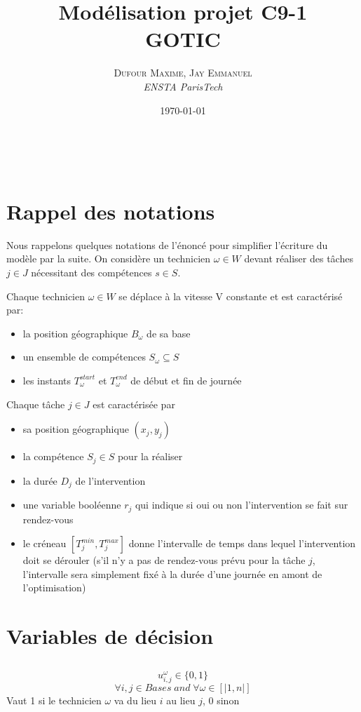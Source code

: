 \documentclass[a4paper, 11pt]{article} %
\title{\textbf{Modélisation projet C9-1}\\ %
GOTIC} %
\author{\textsc{Dufour Maxime, Jay Emmanuel} %
\\{\textit{ENSTA ParisTech}}} %
\date{\today} %
\makeatletter
\renewcommand{\maketitle}{ %
\begin{flushright} %
{\LARGE\@title} %

\vspace{30pt} %

{\large\@author} %
\\\@date %

\vspace{20pt} %
\end{flushright}
}
\makeatother
\begin{document}
\vspace{200pt}

\maketitle %

\section{Rappel des notations}

Nous rappelons quelques notations de l'énoncé pour simplifier l'écriture du modèle par la suite. On considère un technicien $\omega \in W$ devant réaliser des tâches $j \in J$ nécessitant des compétences $s \in S$.

Chaque technicien $\omega \in W$ se déplace à la vitesse V constante et est caractérisé par:
\begin{itemize}
\item la position géographique $B_{\omega}$ de sa base
\item un ensemble de compétences $S_{\omega} \subseteq S$
\item les instants $T_{\omega}^{start}$ et $T_{\omega}^{end}$ de début et fin de journée
\end{itemize}

Chaque tâche $j \in J$ est caractérisée par 
\begin{itemize}
\item sa position géographique $ ( x_j , y_j ) $
\item la compétence $S_j \in S$ pour la réaliser
\item la durée $D_j$ de l'intervention
\item une variable booléenne $r_j$ qui indique si oui ou non l'intervention se fait sur rendez-vous
\item le créneau $[T_j^{min},T_j^{max}]$ donne l'intervalle de temps dans lequel l'intervention doit se dérouler (s'il n'y a pas de rendez-vous prévu pour la tâche $j$, l'intervalle sera simplement fixé à la durée d'une journée en amont de l'optimisation)
\end{itemize}

\section{Variables de décision}
\subsection{}
$$ u_{i,j}^{\omega} \in \{0,1\} $$
$$ \forall i,j \in Bases \; and \; \forall \omega \in [|1,n|] $$
Vaut 1 si le technicien $\omega$ va du lieu $i$ au lieu $j$, 0 sinon
\end{document}
